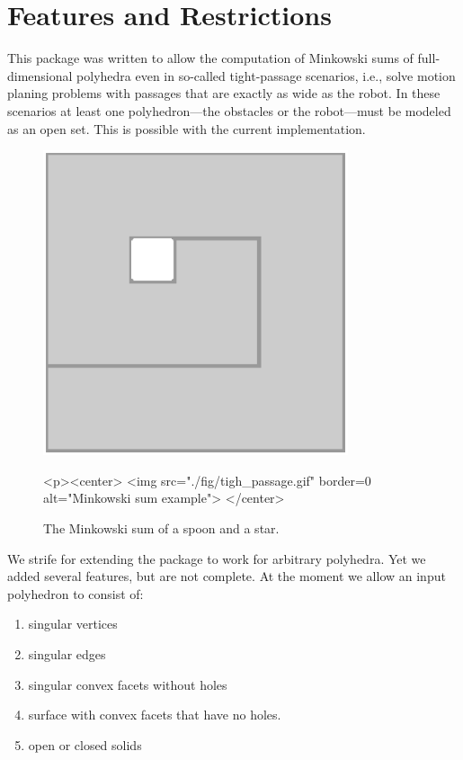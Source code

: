 \section{Features and Restrictions}

This package was written to allow the computation of Minkowski sums of
full-dimensional polyhedra even in so-called tight-passage scenarios,
i.e., solve motion planing problems with passages that are exactly as
wide as the robot. In these scenarios at least one polyhedron---the
obstacles or the robot---must be modeled as an open set. This is
possible with the current implementation.

\begin{figure}
  \begin{ccTexOnly}
    \begin{center}
      \includegraphics[width=0.8\textwidth]{Minkowski_sum_3/fig/tight_passage}
    \end{center}
  \end{ccTexOnly}
  \begin{ccHtmlOnly}
    <p><center>
    <img src="./fig/tigh_passage.gif" border=0 alt="Minkowski sum example">
    </center>
  \end{ccHtmlOnly}
  \caption{The Minkowski sum of a spoon and a star.}
\end{figure}

We strife for extending the package to work for arbitrary
polyhedra. Yet we added several features, but are not complete. At
the moment we allow an input polyhedron to consist of:
\begin{enumerate}
\item singular vertices
\item singular edges
\item singular convex facets without holes
\item surface with convex facets that have no holes.
\item open or closed solids
\end{enumerate}

